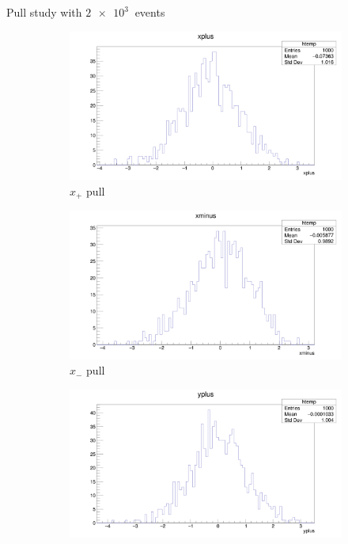 \documentclass{beamer}
\begin{document}
\begin{frame}{Pull study with $\SI{2e3}{}$ events}
  \begin{figure}
    \centering
    \vspace{-0.2cm}
    \begin{subfigure}{0.5\textwidth}
      \includegraphics[width = 1.0\textwidth]{SophisticatedPulls/xplus1K1K.png}
      \caption{$x_+$ pull}
    \end{subfigure}%
    \begin{subfigure}{0.5\textwidth}
      \includegraphics[width = 1.0\textwidth]{SophisticatedPulls/xminus1K1K.png}
      \caption{$x_-$ pull}
    \end{subfigure}
    \begin{subfigure}{0.5\textwidth}
      \includegraphics[width = 1.0\textwidth]{SophisticatedPulls/yplus1K1K.png}

\end{subfigure}
\end{figure}
\end{frame}
\end{document}
